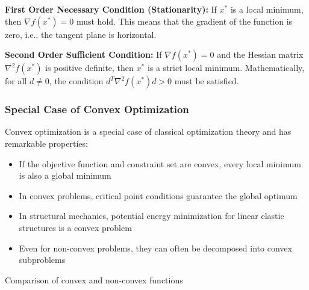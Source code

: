 \textbf{First Order Necessary Condition (Stationarity):} 
If $x^*$ is a local minimum, then $\nabla f(x^*) = 0$ must hold. This means that the gradient of the function is zero, i.e., the tangent plane is horizontal.

\textbf{Second Order Sufficient Condition:} 
If $\nabla f(x^*) = 0$ and the Hessian matrix $\nabla^2 f(x^*)$ is positive definite, then $x^*$ is a strict local minimum. Mathematically, for all $d \neq 0$, the condition $d^T \nabla^2 f(x^*) d > 0$ must be satisfied.


\subsubsection{Special Case of Convex Optimization}

Convex optimization is a special case of classical optimization theory and has remarkable properties:

\begin{itemize}
    \item If the objective function and constraint set are convex, every local minimum is also a global minimum
    \item In convex problems, critical point conditions guarantee the global optimum
    \item In structural mechanics, potential energy minimization for linear elastic structures is a convex problem
    \item Even for non-convex problems, they can often be decomposed into convex subproblems
\end{itemize}

\begin{marginfigure}
\centering
{}
\caption{Comparison of convex and non-convex functions}
\label{fig:convexity}
\end{marginfigure}

